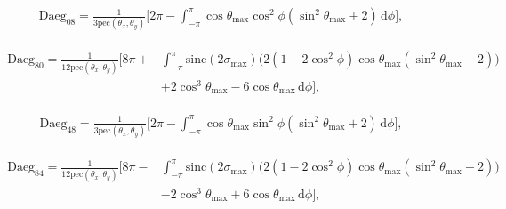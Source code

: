 \documentclass[a4paper,11pt,twoside,openright]{book}
\providecommand{\pec}{{\mathrm{pec}}}%
\providecommand{\sinc}{{\mathrm{sinc}}}%
\def\lthtmlcheckvsize{\ifdim\ht\sizebox<\vsize 
  \ifdim\wd\sizebox<\hsize\expandafter\hfill\fi \expandafter\vfill
  \else\expandafter\vss\fi}%
\begin{document}
{\newpage\clearpage
\setcounter{equation}{52}
%
\begin{subequations}\begin{flalign}
&\textrm{Daeg}_{08} = \frac{1}{3\pec (\theta_x , \theta_y )} \Bigg[
2\pi -
\int_{-\pi}^{\pi}
\cos\theta_{\textrm{max}}\cos^2\phi \left( \sin^2\theta_{\textrm{max}}+ 2 \right)
\,\mathrm{d}\phi
\Bigg] , &
\end{flalign}\end{subequations}%
\lthtmldisplayZ
\lthtmlcheckvsize\clearpage}

{\newpage\clearpage
\setcounter{equation}{52}
%
\begin{subequations}\begin{flalign}
\begin{split}
\textrm{Daeg}_{80} = \frac{1}{12\pec (\theta_x , \theta_y )} \Bigg[
8\pi + &
\int_{-\pi}^{\pi}
\sinc (2\sigma_{\textrm{max}}) \bigg( 2 \left( 1 - 2\cos^2\phi \right) \cos\theta_{\textrm{max}}\left( \sin^2\theta_{\textrm{max}}+ 2 \right) \bigg) \\
& + 2\cos^3\theta_{\textrm{max}}- 6\cos\theta_{\textrm{max}}
\,\mathrm{d}\phi
\Bigg] ,
\end{split} &
\end{flalign}\end{subequations}%
\lthtmldisplayZ
\lthtmlcheckvsize\clearpage}

{\newpage\clearpage
\setcounter{equation}{52}
%
\begin{subequations}\begin{flalign}
&\textrm{Daeg}_{48} = \frac{1}{3\pec (\theta_x , \theta_y )} \Bigg[
2\pi -
\int_{-\pi}^{\pi}
\cos\theta_{\textrm{max}}\sin^2\phi \left( \sin^2\theta_{\textrm{max}}+ 2 \right)
\,\mathrm{d}\phi
\Bigg] , &
\end{flalign}\end{subequations}%
\lthtmldisplayZ
\lthtmlcheckvsize\clearpage}

{\newpage\clearpage
\setcounter{equation}{52}
%
\begin{subequations}\begin{flalign}
\begin{split}
\textrm{Daeg}_{84} = \frac{1}{12\pec (\theta_x , \theta_y )} \Bigg[
8\pi - &
\int_{-\pi}^{\pi}
\sinc (2\sigma_{\textrm{max}}) \bigg( 2 \left( 1 - 2\cos^2\phi \right) \cos\theta_{\textrm{max}}\left( \sin^2\theta_{\textrm{max}}+ 2 \right) \bigg) \\
& - 2\cos^3\theta_{\textrm{max}}+ 6\cos\theta_{\textrm{max}}
\,\mathrm{d}\phi
\Bigg] ,
\end{split} &
\end{flalign}\end{subequations}%
\lthtmldisplayZ
\lthtmlcheckvsize\clearpage}
\end{document}
